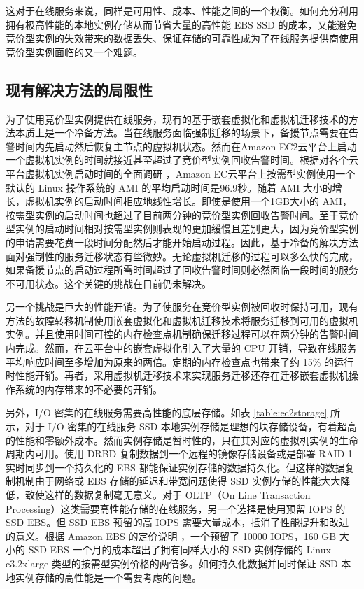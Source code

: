 这对于在线服务来说，同样是可用性、成本、性能之间的一个权衡。如何充分利用拥有极高性能的本地实例存储从而节省大量的高性能 EBS SSD 的成本，又能避免竞价型实例的失效带来的数据丢失、保证存储的可靠性成为了在线服务提供商使用竞价型实例面临的又一个难题。
\subsection{现有解决方法的局限性}
\label{sec:gemini_challenges}
为了使用竞价型实例提供在线服务，现有的基于嵌套虚拟化和虚拟机迁移技术的方法\cite{He:2015:CCH:2749246.2749275}本质上是一个冷备方法。当在线服务面临强制迁移的场景下，备援节点需要在告警时间内先启动然后恢复主节点的虚拟机状态。然而在Amazon EC2云平台上启动一个虚拟机实例的时间就接近甚至超过了竞价型实例回收告警时间。根据对各个云平台虚拟机实例启动时间的全面调研 \cite{Mao:2012:PSV:2353730.2353859}，Amazon EC云平台上按需型实例使用一个默认的 Linux 操作系统的 AMI 的平均启动时间是96.9秒。随着 AMI 大小的增长，虚拟机实例的启动时间相应地线性增长。即使是使用一个1GB大小的 AMI，按需型实例的启动时间也超过了目前两分钟的竞价型实例回收告警时间。至于竞价型实例的启动时间相对按需型实例则表现的更加缓慢且差别更大，因为竞价型实例的申请需要花费一段时间分配然后才能开始启动过程。因此，基于冷备的解决方法面对强制性的服务迁移状态有些微妙。无论虚拟机迁移的过程可以多么快的完成，如果备援节点的启动过程所需时间超过了回收告警时间则必然面临一段时间的服务不可用状态。这个关键的挑战在目前仍未解决。

另一个挑战是巨大的性能开销。为了使服务在竞价型实例被回收时保持可用，现有方法的故障转移机制使用嵌套虚拟化和虚拟机迁移技术将服务迁移到可用的虚拟机实例。并且使用时间可控的内存检查点机制确保迁移过程可以在两分钟的告警时间内完成。然而，在云平台中的嵌套虚拟化引入了大量的 CPU 开销，导致在线服务平均响应时间至多增加为原来的两倍。定期的内存检查点也带来了约 15\% 的运行时性能开销。再者，采用虚拟机迁移技术来实现服务迁移还存在迁移嵌套虚拟机操作系统的内存带来的不必要的开销。

另外，I/O 密集的在线服务需要高性能的底层存储。如表 \ref{table:ec2storage} 所示，对于 I/O 密集的在线服务 SSD 本地实例存储是理想的块存储设备，有着超高的性能和零额外成本。然而实例存储是暂时性的，只在其对应的虚拟机实例的生命周期内可用。使用 DRBD 复制数据到一个远程的镜像存储设备或是部署 RAID-1 实时同步到一个持久化的 EBS 都能保证实例存储的数据持久化。但这样的数据复制机制由于网络或 EBS 存储的延迟和带宽问题使得 SSD 实例存储的性能大大降低，致使这样的数据复制毫无意义。对于 OLTP（On Line Transaction Processing）这类需要高性能存储的在线服务，另一个选择是使用预留 IOPS 的 SSD EBS。但 SSD EBS 预留的高 IOPS 需要大量成本，抵消了性能提升和改进的意义。根据 Amazon EBS 的定价说明 \cite{EBSPricing:2015}，一个预留了 10000 IOPS，160 GB 大小的 SSD EBS 一个月的成本超出了拥有同样大小的 SSD 实例存储的 Linux c3.2xlarge 类型的按需型实例价格的两倍多。如何持久化数据并同时保证 SSD 本地实例存储的高性能是一个需要考虑的问题。

